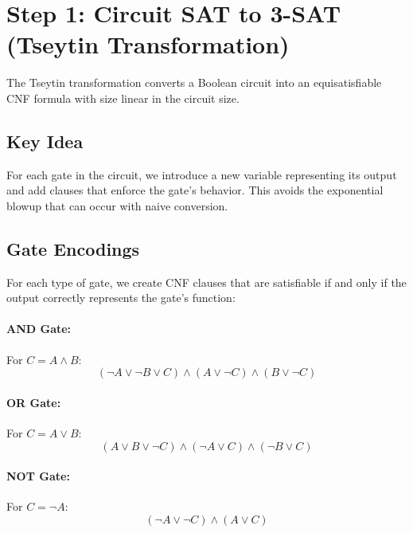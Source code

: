 \documentclass[11pt,a4paper]{article}
\begin{document}
\section{Step 1: Circuit SAT to 3-SAT (Tseytin Transformation)}

The Tseytin transformation converts a Boolean circuit into an equisatisfiable CNF formula with size linear in the circuit size.

\subsection{Key Idea}

For each gate in the circuit, we introduce a new variable representing its output and add clauses that enforce the gate's behavior. This avoids the exponential blowup that can occur with naive conversion.

\subsection{Gate Encodings}

For each type of gate, we create CNF clauses that are satisfiable if and only if the output correctly represents the gate's function:

\paragraph{AND Gate:} For $C = A \land B$:
\[
(\neg A \lor \neg B \lor C) \land (A \lor \neg C) \land (B \lor \neg C)
\]

\paragraph{OR Gate:} For $C = A \lor B$:
\[
(A \lor B \lor \neg C) \land (\neg A \lor C) \land (\neg B \lor C)
\]

\paragraph{NOT Gate:} For $C = \neg A$:
\[
(\neg A \lor \neg C) \land (A \lor C)
\]
\end{document}
